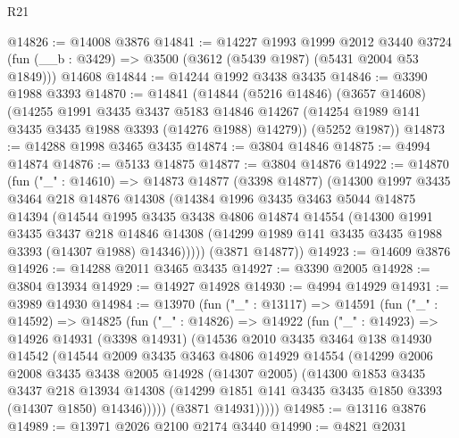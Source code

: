 \begin{lexlean}{R21}
\begin{coremodule}
@14826 := @14008 @3876
@14841 := @14227
    @1993
    @1999
    @2012
    @3440
    @3724
    (fun (__b : @3429) => @3500 (@3612 (@5439 @1987) (@5431 @2004 @53 @1849)))
    @14608
@14844 := @14244 @1992 @3438 @3435
@14846 := @3390 @1988 @3393
@14870 := @14841
    (@14844
      (@5216 @14846)
      (@3657 @14608)
      (@14255
        @1991
        @3435
        @3437
        @5183
        @14846
        @14267
        (@14254 @1989 @141 @3435 @3435 @1988 @3393 (@14276 @1988) @14279))
      (@5252 @1987))
@14873 := @14288 @1998 @3465 @3435
@14874 := @3804 @14846
@14875 := @4994 @14874
@14876 := @5133 @14875
@14877 := @3804 @14876
@14922 := @14870
    (fun ("_" : @14610) =>
    @14873
      @14877
      (@3398 @14877)
      (@14300
        @1997
        @3435
        @3464
        @218
        @14876
        @14308
        (@14384
          @1996
          @3435
          @3463
          @5044
          @14875
          @14394
          (@14544
            @1995
            @3435
            @3438
            @4806
            @14874
            @14554
            (@14300
              @1991
              @3435
              @3437
              @218
              @14846
              @14308
              (@14299 @1989 @141 @3435 @3435 @1988 @3393 (@14307 @1988) @14346)))))
      (@3871 @14877))
@14923 := @14609 @3876
@14926 := @14288 @2011 @3465 @3435
@14927 := @3390 @2005
@14928 := @3804 @13934
@14929 := @14927 @14928
@14930 := @4994 @14929
@14931 := @3989 @14930
@14984 := @13970
    (fun ("_" : @13117) =>
    @14591
      (fun ("_" : @14592) =>
      @14825
        (fun ("_" : @14826) =>
        @14922
          (fun ("_" : @14923) =>
          @14926
            @14931
            (@3398 @14931)
            (@14536
              @2010
              @3435
              @3464
              @138
              @14930
              @14542
              (@14544
                @2009
                @3435
                @3463
                @4806
                @14929
                @14554
                (@14299
                  @2006
                  @2008
                  @3435
                  @3438
                  @2005
                  @14928
                  (@14307 @2005)
                  (@14300
                    @1853
                    @3435
                    @3437
                    @218
                    @13934
                    @14308
                    (@14299 @1851 @141 @3435 @3435 @1850 @3393 (@14307 @1850) @14346)))))
            (@3871 @14931)))))
@14985 := @13116 @3876
@14989 := @13971 @2026 @2100 @2174 @3440
@14990 := @4821 @2031

\end{coremodule}
\end{lexlean}
